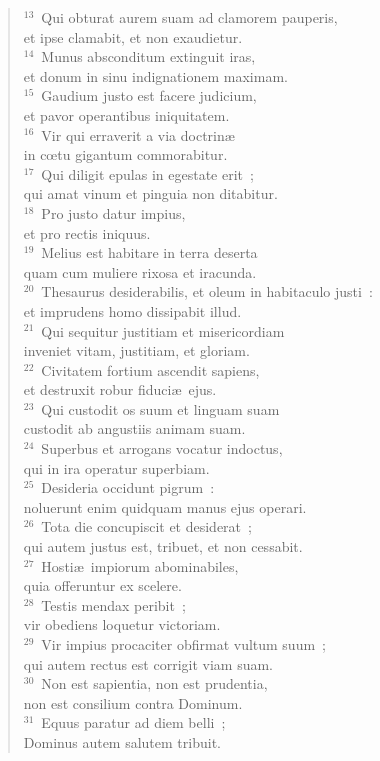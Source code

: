 \begin{flushleft}\begin{verse}${}^{13}$~Qui obturat aurem suam ad clamorem pauperis,\\ et ipse clamabit, et non exaudietur.\\
${}^{14}$~Munus absconditum extinguit iras,\\ et donum in sinu indignationem maximam.\\
${}^{15}$~Gaudium justo est facere judicium,\\ et pavor operantibus iniquitatem.\\
${}^{16}$~Vir qui erraverit a via doctrin\ae \\ in cœtu gigantum commorabitur.\\
${}^{17}$~Qui diligit epulas in egestate erit~;\\ qui amat vinum et pinguia non ditabitur.\\
${}^{18}$~Pro justo datur impius,\\ et pro rectis iniquus.\\
${}^{19}$~Melius est habitare in terra deserta\\ quam cum muliere rixosa et iracunda.\\
${}^{20}$~Thesaurus desiderabilis, et oleum in habitaculo justi~:\\ et imprudens homo dissipabit illud.\\
${}^{21}$~Qui sequitur justitiam et misericordiam\\ inveniet vitam, justitiam, et gloriam.\\
${}^{22}$~Civitatem fortium ascendit sapiens,\\ et destruxit robur fiduci\ae\ ejus.\\
${}^{23}$~Qui custodit os suum et linguam suam\\ custodit ab angustiis animam suam.\\
${}^{24}$~Superbus et arrogans vocatur indoctus,\\ qui in ira operatur superbiam.\\
${}^{25}$~Desideria occidunt pigrum~:\\ noluerunt enim quidquam manus ejus operari.\\
${}^{26}$~Tota die concupiscit et desiderat~;\\ qui autem justus est, tribuet, et non cessabit.\\
${}^{27}$~Hosti\ae\ impiorum abominabiles,\\ quia offeruntur ex scelere.\\
${}^{28}$~Testis mendax peribit~;\\ vir obediens loquetur victoriam.\\
${}^{29}$~Vir impius procaciter obfirmat vultum suum~;\\ qui autem rectus est corrigit viam suam.\\
${}^{30}$~Non est sapientia, non est prudentia,\\ non est consilium contra Dominum.\\
${}^{31}$~Equus paratur ad diem belli~;\\ Dominus autem salutem tribuit.\end{verse}\end{flushleft}



